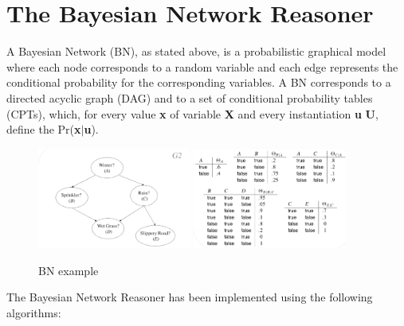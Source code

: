 \section{The Bayesian Network Reasoner}
\label{BNReasoner}

A Bayesian Network (BN), as stated above, is a probabilistic graphical model where each node corresponds to a random variable and each edge represents the conditional probability for the corresponding variables. A BN corresponds to a directed acyclic graph (DAG) and to a set of conditional probability tables (CPTs), which, for every value \textbf{x} of variable \textbf{X} and every instantiation \textbf{u} \textbf{U}, define the Pr(\textbf{x}$\mid$\textbf{u}). 

\intextsep
\begin{figure}[H]
    \centering
    \includegraphics[width=0.45\textwidth]{Assets/BN example1.png}
    \hfill
    \includegraphics[width=0.45\textwidth]{Assets/BN example2.png}
    \caption{BN example}
    \label{fig:my_label}
\end{figure}

The Bayesian Network Reasoner has been implemented using the following algorithms:

